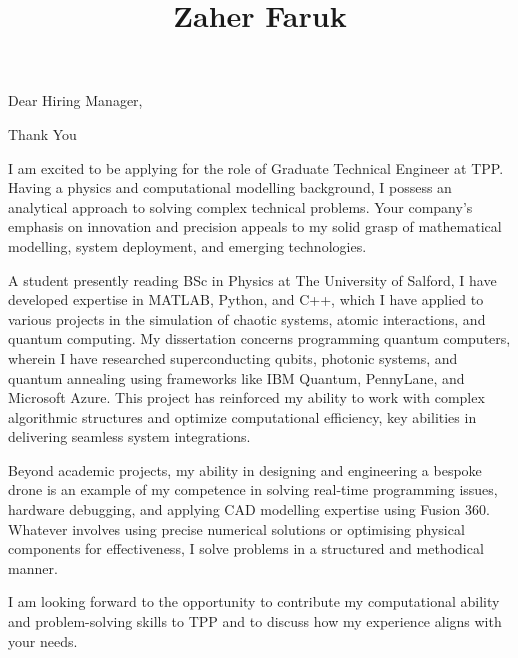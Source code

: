 \documentclass[11pt,a4paper,roman]{moderncv}        %
\title{Zaher Faruk}                               %
\begin{document}
\opening{Dear Hiring Manager,} 
\closing{Thank You}
\makelettertitle


I am excited to be applying for the role of Graduate Technical Engineer at TPP. Having a physics and computational modelling background, I possess an analytical approach to solving complex technical problems. Your company's emphasis on innovation and precision appeals to my solid grasp of mathematical modelling, system deployment, and emerging technologies.

A student presently reading BSc in Physics at The University of Salford, I have developed expertise in MATLAB, Python, and C++, which I have applied to various projects in the simulation of chaotic systems, atomic interactions, and quantum computing. My dissertation concerns programming quantum computers, wherein I have researched superconducting qubits, photonic systems, and quantum annealing using frameworks like IBM Quantum, PennyLane, and Microsoft Azure. This project has reinforced my ability to work with complex algorithmic structures and optimize computational efficiency, key abilities in delivering seamless system integrations.

Beyond academic projects, my ability in designing and engineering a bespoke drone is an example of my competence in solving real-time programming issues, hardware debugging, and applying CAD modelling expertise using Fusion 360. Whatever involves using precise numerical solutions or optimising physical components for effectiveness, I solve problems in a structured and methodical manner.

I am looking forward to the opportunity to contribute my computational ability and problem-solving skills to TPP and to discuss how my experience aligns with your needs. 

\vspace{0.5cm}


\makeletterclosing
\end{document}
